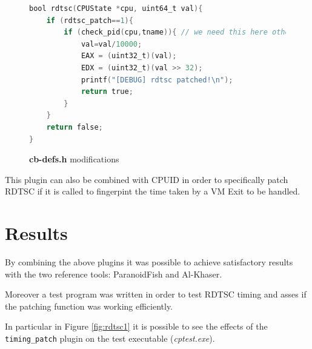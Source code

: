 \begin{figure}[htp]
\centering
\begin{lstlisting}[language=C]
bool rdtsc(CPUState *cpu, uint64_t val){
    if (rdtsc_patch==1){
        if (check_pid(cpu,tname)){ // we need this here otherwise it will segfault
            val=val/10000;
            EAX = (uint32_t)(val);
            EDX = (uint32_t)(val >> 32);
            printf("[DEBUG] rdtsc patched!\n");
            return true;
        }
    }
    return false;
}
\end{lstlisting}
\caption{\textbf{cb-defs.h} modifications}
\label{fig:rdtscpatch}
\end{figure}

This plugin can also be combined with CPUID in order to specifically patch RDTSC if it is called to fingerpint the time taken by a VM Exit to be handled. 

\section{Results}

By combining the above plugins it was possible to achieve satisfactory results with the two reference tools: ParanoidFish and Al-Khaser. 

Moreover a test program was written in order to test RDTSC timing and asses if the patching function was working efficiently.

In particular in Figure \ref{fig:rdtsc1} it is possible to see the effects of the \lstinline{timing_patch} plugin on the test executable (\textit{cptest.exe}).

